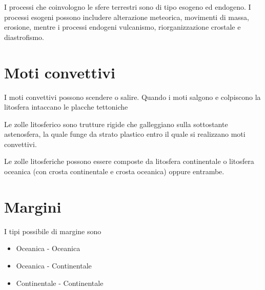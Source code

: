 \documentclass[a4paper]{article}
\begin{document}



I processi che coinvologno le sfere terrestri sono di tipo esogeno ed endogeno.
I processi esogeni possono includere alterazione meteorica, movimenti di massa, erosione,
mentre i processi endogeni vulcanismo, riorganizzazione crostale e diastrofismo.

\pagebreak

\section{Moti convettivi}


I moti convettivi possono scendere o salire.
Quando i moti salgono e colpiscono la litosfera intaccano le placche tettoniche

Le zolle litosferico sono trutture rigide che galleggiano sulla sottostante astenosfera,
la quale funge da strato plastico entro il quale si realizzano moti convettivi.

Le zolle litosferiche possono essere composte da litosfera continentale o litosfera oceanica
(con crosta continentale e crosta oceanica) oppure entrambe.

\section{Margini}

I tipi possibile di margine sono
\begin{itemize}
    \item Oceanica - Oceanica
    \item Oceanica - Continentale
    \item Continentale - Continentale
\end{itemize}
\end{document}
